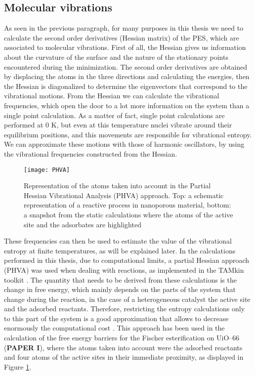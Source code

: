 \subsection*{Molecular vibrations}
As seen in the previous paragraph, for many purposes in this thesis we need to calculate the second order derivatives (Hessian matrix) of the PES, which are associated to molecular vibrations. First of all, the Hessian gives us information about the curvature of the surface and the nature of the stationary points encountered during the minimization. The second order derivatives are obtained by displacing the atoms in the three directions and calculating the energies, then the Hessian is diagonalized to determine the eigenvectors that correspond to the vibrational motions.
From the Hessian we can calculate the vibrational frequencies, which open the door to a lot more information on the system than a single point calculation. As a matter of fact, single point calculations are performed at 0 K, but even at this temperature nuclei vibrate around their equilibrium positions, and this movements are responsible for vibrational entropy. We can approximate these motions with those of harmonic oscillators, by using the vibrational frequencies constructed from the Hessian. 
\npar
\begin{figure}[!htbp]
	\centering
 	\texttt{[image: PHVA]}
	\caption{Representation of the atoms taken into account in the Partial Hessian Vibrational Analysis (PHVA) approach. Top: a schematic representation of a reactive process in nanoporous material, bottom: a snapshot from the static calculations where the atoms of the active site and the adsorbates are highlighted}
 \label{fig:PHVA}
\end{figure}
These frequencies can then be used to estimate the value of the vibrational entropy at finite temperatures, as will be explained later. In the calculations performed in this thesis, due to computational limits, a partial Hessian approach (PHVA) was used when dealing with reactions, as implemented in the TAMkin toolkit \cite{Ghysels2010}. The quantity that needs to be derived from these calculations is the change in free energy, which mainly depends on the parts of the system that change during the reaction, in the case of a heterogeneous catalyst the active site and the adsorbed reactants. Therefore, restricting the entropy calculations only to this part of the system is a good approximation that allows to decrease enormously the computational cost \cite{Ghysels2007}. This approach has been used in the calculation of the free energy barriers for the Fischer esterification on UiO--66 (\textbf{PAPER I}), where the atoms taken into account were the adsorbed reactants and four atoms of the active sites in their immediate proximity, as displayed in Figure \ref{fig:PHVA}.
